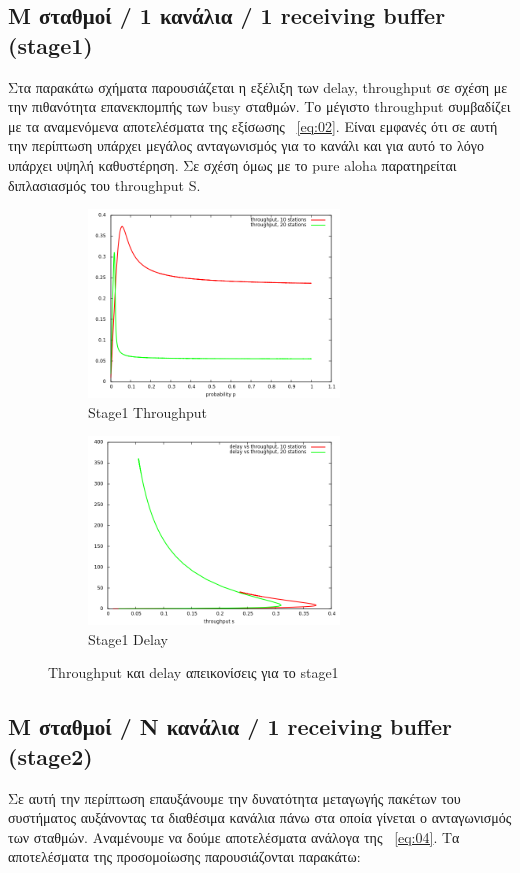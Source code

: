 \documentclass[12pt]{report}
\begin{document}
\subsection{\textlatin{M} σταθμοί / 1 κανάλια / 1 \textlatin{receiving buffer} (\textlatin{stage1})}
Στα παρακάτω σχήματα παρουσιάζεται η εξέλιξη των \textlatin{delay, throughput} σε σχέση με την πιθανότητα επανεκπομπής των \textlatin{busy} σταθμών. Το μέγιστο \textlatin{throughput} συμβαδίζει με τα αναμενόμενα αποτελέσματα της εξίσωσης ~\ref{eq:02}. Είναι εμφανές ότι σε αυτή την περίπτωση υπάρχει μεγάλος ανταγωνισμός για το κανάλι και για αυτό το λόγο υπάρχει υψηλή καθυστέρηση. Σε σχέση όμως με το \textlatin{pure aloha} παρατηρείται διπλασιασμός του \textlatin{throughput S}.
\begin{figure}[h]
\begin{subfigure}{0.5\textwidth}
\includegraphics[width=0.9\linewidth, height=5cm]{st1_throughput} 
\caption{\textlatin{Stage1 Throughput}}
\label{fig:st1_throughput}
\end{subfigure}
\begin{subfigure}{0.5\textwidth}
\includegraphics[width=0.9\linewidth, height=5cm]{st1_delay}
\caption{\textlatin{Stage1 Delay}}
\label{fig:st1_delay}
\end{subfigure}
 
\caption{\textlatin{Throughput} και \textlatin{delay} απεικονίσεις για το \textlatin{stage1}}
\label{fig:Stage1}
\end{figure}

\subsection{\textlatin{M} σταθμοί / \textlatin{N} κανάλια / 1 \textlatin{receiving buffer} (\textlatin{stage2})}
Σε αυτή την περίπτωση επαυξάνουμε την δυνατότητα μεταγωγής πακέτων του συστήματος αυξάνοντας τα διαθέσιμα κανάλια πάνω στα οποία γίνεται ο ανταγωνισμός των σταθμών. Αναμένουμε να δούμε αποτελέσματα ανάλογα της ~\ref{eq:04}. Τα αποτελέσματα της προσομοίωσης παρουσιάζονται παρακάτω:
\end{document}
